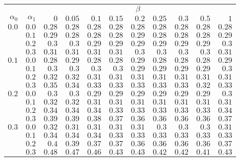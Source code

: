 \begin{tabular}{rr|rrrrrrrrr}
\hline\hline
 && \multicolumn{9}{c}{$\beta$}\\
 $\alpha_0$ & $\alpha_1$ & $0$ & $0.05$ & $0.1$ & $0.15$ & $0.2$ & $0.25$ & $0.3$ & $0.5$ & $1$ \\ 
 \hline
$0.0$ & $0.0$ & $0.28$ & $0.28$ & $0.28$ & $0.28$ & $0.28$ & $0.28$ & $0.28$ & $0.28$ & $0.28$\\ 
 & $0.1$ & $0.29$ & $0.28$ & $0.28$ & $0.28$ & $0.29$ & $0.28$ & $0.28$ & $0.28$ & $0.29$\\ 
 & $0.2$ & $0.3$ & $0.3$ & $0.29$ & $0.29$ & $0.29$ & $0.29$ & $0.29$ & $0.29$ & $0.3$\\ 
 & $0.3$ & $0.31$ & $0.31$ & $0.31$ & $0.31$ & $0.3$ & $0.3$ & $0.3$ & $0.3$ & $0.31$\\ 
\hline 
 $0.1$ & $0.0$ & $0.28$ & $0.29$ & $0.28$ & $0.28$ & $0.29$ & $0.28$ & $0.28$ & $0.28$ & $0.29$\\ 
 & $0.1$ & $0.3$ & $0.3$ & $0.3$ & $0.3$ & $0.29$ & $0.29$ & $0.29$ & $0.29$ & $0.3$\\ 
 & $0.2$ & $0.32$ & $0.32$ & $0.31$ & $0.31$ & $0.31$ & $0.31$ & $0.31$ & $0.31$ & $0.31$\\ 
 & $0.3$ & $0.35$ & $0.34$ & $0.33$ & $0.33$ & $0.33$ & $0.33$ & $0.33$ & $0.32$ & $0.33$\\ 
\hline 
 $0.2$ & $0.0$ & $0.3$ & $0.3$ & $0.29$ & $0.29$ & $0.29$ & $0.29$ & $0.29$ & $0.29$ & $0.3$\\ 
 & $0.1$ & $0.32$ & $0.32$ & $0.31$ & $0.31$ & $0.31$ & $0.31$ & $0.31$ & $0.31$ & $0.31$\\ 
 & $0.2$ & $0.34$ & $0.34$ & $0.34$ & $0.33$ & $0.33$ & $0.33$ & $0.33$ & $0.33$ & $0.34$\\ 
 & $0.3$ & $0.39$ & $0.39$ & $0.38$ & $0.37$ & $0.36$ & $0.36$ & $0.36$ & $0.36$ & $0.37$\\ 
\hline 
 $0.3$ & $0.0$ & $0.32$ & $0.31$ & $0.31$ & $0.31$ & $0.31$ & $0.3$ & $0.3$ & $0.3$ & $0.31$\\ 
 & $0.1$ & $0.34$ & $0.34$ & $0.34$ & $0.33$ & $0.33$ & $0.33$ & $0.33$ & $0.33$ & $0.33$\\ 
 & $0.2$ & $0.4$ & $0.39$ & $0.37$ & $0.37$ & $0.36$ & $0.36$ & $0.36$ & $0.36$ & $0.37$\\ 
 & $0.3$ & $0.48$ & $0.47$ & $0.46$ & $0.43$ & $0.43$ & $0.42$ & $0.42$ & $0.41$ & $0.43$\\ 
 \hline 
 \end{tabular}